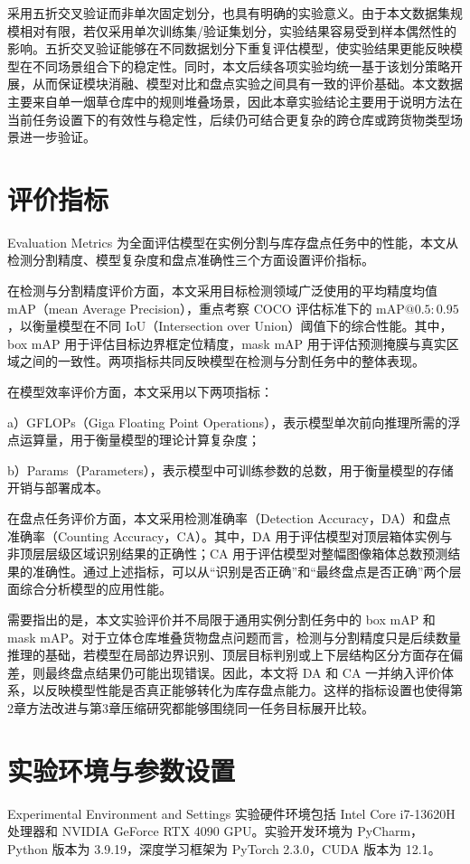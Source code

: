 采用五折交叉验证而非单次固定划分，也具有明确的实验意义。由于本文数据集规模相对有限，若仅采用单次训练集/验证集划分，实验结果容易受到样本偶然性的影响。五折交叉验证能够在不同数据划分下重复评估模型，使实验结果更能反映模型在不同场景组合下的稳定性。同时，本文后续各项实验均统一基于该划分策略开展，从而保证模块消融、模型对比和盘点实验之间具有一致的评价基础。本文数据主要来自单一烟草仓库中的规则堆叠场景，因此本章实验结论主要用于说明方法在当前任务设置下的有效性与稳定性，后续仍可结合更复杂的跨仓库或跨货物类型场景进一步验证。

\section{评价指标}{Evaluation Metrics}
为全面评估模型在实例分割与库存盘点任务中的性能，本文从检测分割精度、模型复杂度和盘点准确性三个方面设置评价指标。

在检测与分割精度评价方面，本文采用目标检测领域广泛使用的平均精度均值 mAP（mean Average Precision），重点考察 COCO 评估标准下的 $\mathrm{mAP}@0.5{:}0.95$，以衡量模型在不同 IoU（Intersection over Union）阈值下的综合性能。其中，box mAP 用于评估目标边界框定位精度，mask mAP 用于评估预测掩膜与真实区域之间的一致性。两项指标共同反映模型在检测与分割任务中的整体表现。

在模型效率评价方面，本文采用以下两项指标：

a）GFLOPs（Giga Floating Point Operations），表示模型单次前向推理所需的浮点运算量，用于衡量模型的理论计算复杂度；

b）Params（Parameters），表示模型中可训练参数的总数，用于衡量模型的存储开销与部署成本。

在盘点任务评价方面，本文采用检测准确率（Detection Accuracy，DA）和盘点准确率（Counting Accuracy，CA）。其中，DA 用于评估模型对顶层箱体实例与非顶层层级区域识别结果的正确性；CA 用于评估模型对整幅图像箱体总数预测结果的准确性。通过上述指标，可以从“识别是否正确”和“最终盘点是否正确”两个层面综合分析模型的应用性能。

需要指出的是，本文实验评价并不局限于通用实例分割任务中的 box mAP 和 mask mAP。对于立体仓库堆叠货物盘点问题而言，检测与分割精度只是后续数量推理的基础，若模型在局部边界识别、顶层目标判别或上下层结构区分方面存在偏差，则最终盘点结果仍可能出现错误。因此，本文将 DA 和 CA 一并纳入评价体系，以反映模型性能是否真正能够转化为库存盘点能力。这样的指标设置也使得第2章方法改进与第3章压缩研究都能够围绕同一任务目标展开比较。

\section{实验环境与参数设置}{Experimental Environment and Settings}
实验硬件环境包括 Intel Core i7-13620H 处理器和 NVIDIA GeForce RTX 4090 GPU。实验开发环境为 PyCharm，Python 版本为 3.9.19，深度学习框架为 PyTorch 2.3.0，CUDA 版本为 12.1。

